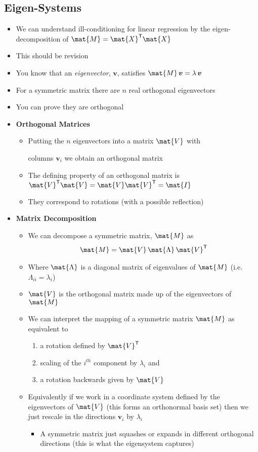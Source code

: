 \documentclass[11pt]{article}
\newcommand{\tr}{\textsf{T}}
\begin{document}
\subsection{Eigen-Systems}
\label{sec:org0f170ab}
\begin{itemize}
\item We can understand ill-conditioning for linear regression by the
eigen-decomposition of \(\mat{M}=\mat{X}^\tr \mat{X}\)
\item This should be revision
\item You know that an \emph{eigenvector}, \(\bm{v}\), satisfies \(\mat{M}\,\bm{v}=\lambda\,\bm{v}\)
\item For a symmetric matrix there are \(n\) real orthogonal eigenvectors
\item You can prove they are orthogonal
\item \textbf{Orthogonal Matrices}
\begin{itemize}
\item Putting the \(n\) eigenvectors into a matrix \(\mat{V}\) with

columns \(\bm{v}_i\) we obtain an orthogonal matrix
\item The defining property of an orthogonal matrix is
\(\mat{V}^\tr\mat{V} = \mat{V}\mat{V}^\tr=\mat{I}\)
\item They correspond to rotations (with a possible reflection)
\end{itemize}
\item \textbf{Matrix Decomposition}
\begin{itemize}
\item We can decompose a symmetric matrix, \(\mat{M}\) as
\begin{align*}
  \mat{M} = \mat{V}\,\mat{\Lambda}\,\mat{V}^\tr
\end{align*}
\item Where \(\mat{\Lambda}\) is a diagonal matrix of eigenvalues of \(\mat{M}\) 
(i.e. \(\Lambda_{ii}=\lambda_i\))
\item \(\mat{V}\) is the orthogonal matrix made up of the eigenvectors of \(\mat{M}\)
\item We can interpret the mapping of a symmetric matrix \(\mat{M}\) as
equivalent to
\begin{enumerate}
\item a rotation defined by \(\mat{V}^\tr\)
\item scaling of the \(i^{th}\) component by \(\lambda_i\) and
\item a rotation backwards given by \(\mat{V}\)
\end{enumerate}
\item Equivalently if we work in a coordinate system defined by the
eigenvectors of \(\mat{V}\) (this forms an orthonormal basis set)
then we just rescale in the directions \(\bm{v}_i\) by \(\lambda_i\)
\begin{itemize}
\item A symmetric matrix just squashes or expands in different
orthogonal directions (this is what  the eigensystem captures)
\end{itemize}
\end{itemize}


\end{itemize}
\end{document}
